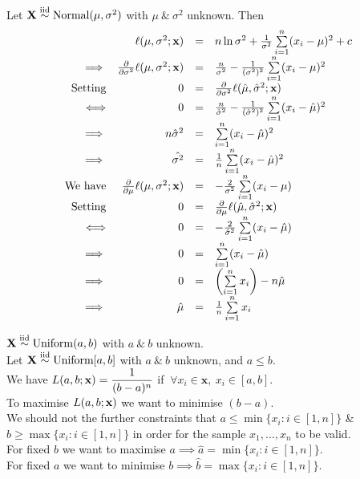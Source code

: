 \documentclass[11pt,a4paper]{article}
\begin{document}
\apart
Let $\textbf{X}\overset{\text{iid}}{\sim}\text{Normal}(\mu,\sigma^2)$ with $\mu\ \&\ \sigma^2$ unknown. Then
\[\begin{array}{rrcl}
&\ell(\mu,\sigma^2;\textbf{x})&=&n\ln\sigma^2+\frac{1}{\sigma^2}\sum\limits_{i=1}^n(x_i-\mu)^2+c\\
\implies&\frac{\partial}{\partial\sigma^2}\ell(\mu,\sigma^2;\textbf{x})&=&\frac{n}{\sigma^2}-\frac{1}{(\sigma^2)^2}\sum\limits_{i=1}^n(x_i-\mu)^2\\
\text{Setting}&0&=&\frac{\partial}{\partial\sigma^2}\ell(\hat{\mu},\hat{\sigma}^2;\textbf{x})\\
\Longleftrightarrow&0&=&\frac{n}{\hat{\sigma}^2}-\frac{1}{(\hat{\sigma}^2)^2}\sum\limits_{i=1}^n(x_i-\hat{\mu})^2\\
\implies&n\hat{\sigma}^2&=&\sum\limits_{i=1}^n(x_i-\hat{\mu})^2\\
\implies&\hat{\sigma^2}&=&\frac{1}{n}\sum\limits_{i=1}^n(x_i-\hat{\mu})^2\\
\text{We have}&\frac{\partial}{\partial\mu}\ell(\mu,\sigma^2;\textbf{x})&=&-\frac{2}{\sigma^2}\sum\limits_{i=1}^n(x_i-\mu)\\
\text{Setting}&0&=&\frac{\partial}{\partial\mu}\ell(\hat{\mu},\hat{\sigma}^2;\textbf{x})\\
\Longleftrightarrow&0&=&-\frac{2}{\hat{\sigma}^2}\sum\limits_{i=1}^n(x_i-\hat{\mu})\\
\implies&0&=&\sum\limits_{i=1}^n(x_i-\hat{\mu})\\
\implies&0&=&\left(\sum\limits_{i=1}^nx_i\right)-n\hat{\mu}\\
\implies&\hat{\mu}&=&\frac{1}{n}\sum\limits_{i=1}^nx_i
\end{array}\]

\qpartnb $\textbf{X}\overset{\mathrm{iid}}{\sim}\mathrm{Uniform}(a,b)$ with $a\ \&\ b$ unknown.\\

\apart
Let $\textbf{X}\overset{\text{iid}}{\sim}\text{Uniform}[a,b]$ with $a\ \&\ b$ unknown, and $a\leq b$.\\
We have $L(a,b;\textbf{x})=\dfrac{1}{(b-a)^n}$ if $\ \forall x_i\in\textbf{x},\ x_i\in[a,b]$.\\
To maximise $L(a,b;\textbf{x})$ we want to minimise $(b-a)$.\\
We should not the further constraints that $a\leq\min\{x_i:i\in[1,n]\}$ \& $b\geq\max\{x_i:i\in[1,n]\}$ in order for the sample $x_1,\dots,x_n$ to be valid.\\
For fixed $b$ we want to maximise $a\implies\hat{a}=\min\{x_i:i\in[1,n]\}$.\\
For fixed $a$ we want to minimise $b\implies\hat{b}=\max\{x_i:i\in[1,n]\}$.
\end{document}
